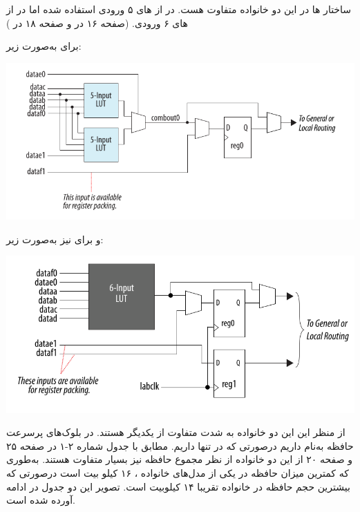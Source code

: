 \begin{qsolve}
	ساختار  ها در این دو خانواده متفاوت هست. در  از  های ۵ ورودی استفاده شده اما در  از  های ۶ ورودی. (صفحه ۱۶ در \cite{ref1} و صفحه ۱۸ در \cite{ref2})
\end{qsolve}




\begin{qsolve}
	برای  به‌صورت زیر:
	\begin{center}
		\includegraphics*[width=0.8\linewidth]{pics/img4.png}
		\label{ساختار LUT ها در Cyclone}
	\end{center}
	
	
	و برای  نیز به‌صورت زیر:
	\begin{center}
		\includegraphics*[width=0.8\linewidth]{pics/img3.png}
		\label{ساختار LUT ها در Stratix}
	\end{center}
	
	
	
	
	از منظر  این این دو خانواده به شدت متفاوت از یکدیگر هستند. در  بلوک‌های پرسرعت حافظه به‌نام  داریم در‌صورتی که در  تنها  داریم. مطابق با جدول شماره ۲-۱ در صفحه ۲۵ \cite{ref2} و صفحه ۲۰ از \cite{ref1} این دو خانواده از نظر مجموع حافظه نیز بسیار متفاوت هستند. به‌طوری که کمترین میزان حافظه در یکی از مدل‌های خانواده ،
	۱۶ کیلو بیت است درصورتی که بیشترین حجم حافظه در خانواده  تقریبا ۱۴ کیلوبیت است. تصویر این دو جدول در ادامه آورده شده است.
	
	
\end{qsolve}




